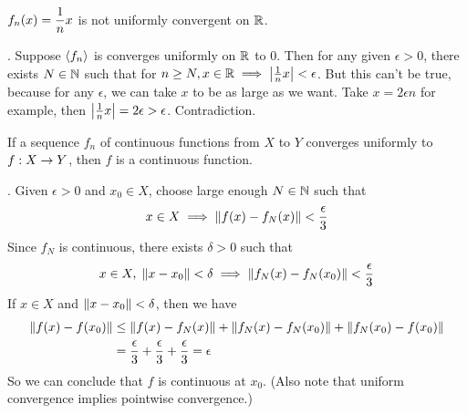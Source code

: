  \(\displaystyle f_n(x) = \frac{1}{n}x\) is not uniformly convergent on \(\mathbb{R}\).

\pf. Suppose \(\left\langle f_n \right\rangle\) is converges uniformly on \(\mathbb{R}\) to 0. Then for any given \(\epsilon > 0\), there exists \(N\in\mathbb{N}\) such that for \(n\geq N, x\in \mathbb{R} \implies \left|\frac{1}{n}x\right| < \epsilon\). But this can't be true, because for any \(\epsilon\), we can take \(x\) to be as large as we want. Take \(x = 2\epsilon n\) for example, then \(\left|\frac{1}{n}x\right| = 2\epsilon > \epsilon\). Contradiction.

 If a sequence \(f_n\) of continuous functions from \(X\) to \(Y\) converges uniformly to \(f: X \rightarrow Y\), then \(f\) is a continuous function.

\pf. Given \(\epsilon > 0\) and \(x_0 \in X\), choose large enough \(N\in\mathbb{N}\) such that
\[
	x \in X \implies \left\lVert f(x) - f_N(x)\right\rVert < \frac{\epsilon}{3}	
\]
Since \(f_N\) is continuous, there exists \(\delta > 0\) such that
\[
	x\in X,\; \left\lVert x - x_0\right\rVert < \delta \implies \left\lVert f_N(x) - f_N(x_0)\right\rVert < \frac{\epsilon}{3}	
\]
If \(x\in X\) and \(\left\lVert x - x_0\right\rVert < \delta\), then we have
\[
	\begin{aligned}
	\left\lVert f(x) - f(x_0)\right\rVert &\leq \left\lVert f(x) - f_N(x)\right\rVert + \left\lVert f_N(x) - f_N(x_0)\right\rVert + \left\lVert f_N(x_0) -f(x_0)\right\rVert \\
		&= \frac{\epsilon}{3} + \frac{\epsilon}{3} + \frac{\epsilon}{3} = \epsilon
\end{aligned}
\]
So we can conclude that \(f\) is continuous at \(x_0\). (Also note that uniform convergence implies pointwise convergence.)
